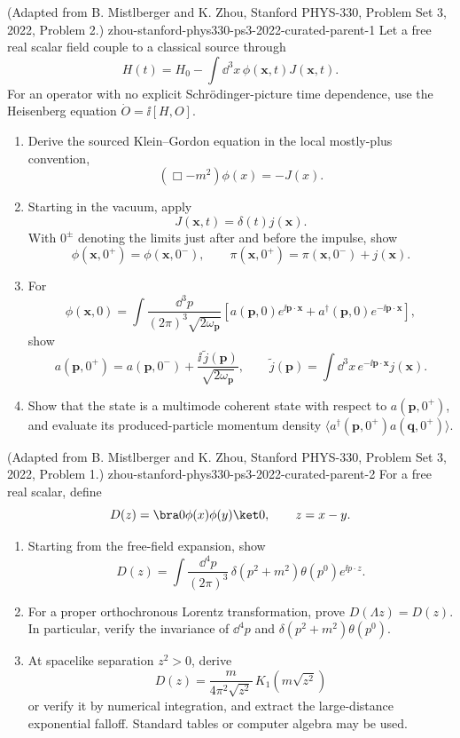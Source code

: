 \begin{enumerate}
  {(Adapted from B. Mistlberger and K. Zhou, Stanford PHYS-330, Problem Set 3, 2022, Problem 2.)}
  {zhou-stanford-phys330-ps3-2022-curated-parent-1}
Let a free real scalar field couple to a classical source through
\[
 H(t)=H_0-\int \dd^3x\,\phi(\mathbf x,t)J(\mathbf x,t).
\]
For an operator with no explicit Schr\"odinger-picture time dependence,
use the Heisenberg equation \(\dot O=\ii[H,O]\).
\begin{enumerate}
\item
Derive the sourced Klein--Gordon equation in the local mostly-plus
convention,
\[
 (\Box-m^2)\phi(x)=-J(x).
\]
\item
Starting in the vacuum, apply
\[
 J(\mathbf x,t)=\delta(t)j(\mathbf x).
\]
With \(0^\pm\) denoting the limits just after and before the impulse,
show
\[
 \phi(\mathbf x,0^+)=\phi(\mathbf x,0^-),\qquad
 \pi(\mathbf x,0^+)=\pi(\mathbf x,0^-)+j(\mathbf x).
\]
\item
For
\[
 \phi(\mathbf x,0)=
 \int\frac{\dd^3p}{(2\pi)^3\sqrt{2\omega_{\mathbf p}}}
 \left[a(\mathbf p,0)e^{\ii\mathbf p\cdot\mathbf x}
 +a^\dagger(\mathbf p,0)e^{-\ii\mathbf p\cdot\mathbf x}\right],
\]
show
\[
 a(\mathbf p,0^+)=a(\mathbf p,0^-)
 +\frac{\ii\,\widetilde j(\mathbf p)}{\sqrt{2\omega_{\mathbf p}}},
\qquad
 \widetilde j(\mathbf p)=\int \dd^3x\,
 e^{-\ii\mathbf p\cdot\mathbf x}j(\mathbf x).
\]
\item
Show that the state is a multimode coherent state with respect to
\(a(\mathbf p,0^+)\), and evaluate its produced-particle momentum
density
\(\langle a^\dagger(\mathbf p,0^+)a(\mathbf q,0^+)\rangle\).
\end{enumerate}

  {(Adapted from B. Mistlberger and K. Zhou, Stanford PHYS-330, Problem Set 3, 2022, Problem 1.)}
  {zhou-stanford-phys330-ps3-2022-curated-parent-2}
For a free real scalar, define
\[
 D(z)=\bra0\phi(x)\phi(y)\ket0,\qquad z=x-y.
\]
\begin{enumerate}
\item
Starting from the free-field expansion, show
\[
 D(z)=\int\frac{\dd^4p}{(2\pi)^3}\,
 \delta(p^2+m^2)\theta(p^0)e^{\ii p\cdot z}.
\]
\item
For a proper orthochronous Lorentz transformation, prove
\(D(\Lambda z)=D(z)\).  In particular, verify the invariance of
\(\dd^4p\) and \(\delta(p^2+m^2)\theta(p^0)\).
\item
At spacelike separation \(z^2>0\), derive
\[
 D(z)=\frac{m}{4\pi^2\sqrt{z^2}}\,
 K_1\!\left(m\sqrt{z^2}\right)
\]
or verify it by numerical integration, and extract the large-distance
exponential falloff.  Standard tables or computer algebra may be used.


\end{enumerate}
\end{enumerate}
